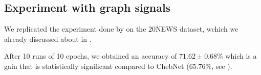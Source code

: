 



\subsection{Experiment with graph signals}

We replicated the experiment done by \cite{defferrard2016convolutional} on the 20NEWS dataset, wchich we already discussed about in .


After 10 runs of 10 epochs, we obtained an accuracy of $71.62 \pm 0.68\%$ which is a gain that is statistically significant compared to ChebNet ($65.76\%$, see ).





